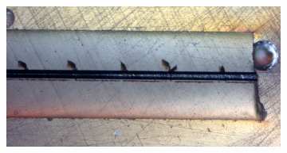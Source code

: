 \begin{figure}[h]
\begin{subfigure}{.7\textwidth}
  \centering
  \includegraphics[width=\linewidth]{fig/polishing/parallelcrack3.jpg}
  \label{fig:sfig3}
\end{subfigure}
\caption{}
\label{fig:si_sige}
\end{figure}
\FloatBarrier
